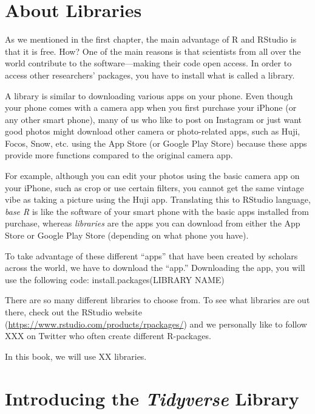 \documentclass[
]{book}
\begin{document}
\hypertarget{about-libraries}{%
\section{About Libraries}\label{about-libraries}}

As we mentioned in the first chapter, the main advantage of R and RStudio is that it is free. How? One of the main reasons is that scientists from all over the world contribute to the software---making their code open access. In order to access other researchers' packages, you have to install what is called a library.

A library is similar to downloading various apps on your phone. Even though your phone comes with a camera app when you first purchase your iPhone (or any other smart phone), many of us who like to post on Instagram or just want good photos might download other camera or photo-related apps, such as Huji, Focos, Snow, etc. using the App Store (or Google Play Store) because these apps provide more functions compared to the original camera app.

For example, although you can edit your photos using the basic camera app on your iPhone, such as crop or use certain filters, you cannot get the same vintage vibe as taking a picture using the Huji app. Translating this to RStudio language, \emph{base R} is like the software of your smart phone with the basic apps installed from purchase, whereas \emph{libraries} are the apps you can download from either the App Store or Google Play Store (depending on what phone you have).

To take advantage of these different ``apps'' that have been created by scholars across the world, we have to download the ``app.'' Downloading the app, you will use the following code:
install.packages(LIBRARY NAME)

There are so many different libraries to choose from. To see what libraries are out there, check out the RStudio website (\url{https://www.rstudio.com/products/rpackages/}) and we personally like to follow XXX on Twitter who often create different R-packages.

In this book, we will use XX libraries.

\hypertarget{introducing-the-tidyverse-library}{%
\section{\texorpdfstring{Introducing the \emph{Tidyverse} Library}{Introducing the Tidyverse Library}}\label{introducing-the-tidyverse-library}}
\end{document}
